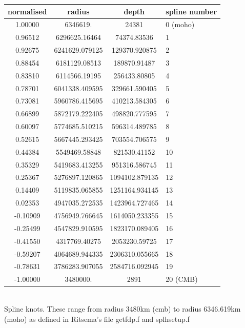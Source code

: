 \begin{center}
\begin{tabular}{cccl}
\hline 
normalised & radius & depth & spline number\\
\hline 
\hline 
1.00000  & 6346619.       &  24381          &0 (moho)\\
0.96512  & 6296625.16464  &  74374.83536    &1\\
0.92675  & 6241629.079125 &  129370.920875  &2\\
0.88454  & 6181129.08513  &  189870.91487   &3\\
0.83810  & 6114566.19195  &  256433.80805   &4\\
0.78701  & 6041338.409595 &  329661.590405  &5\\
0.73081  & 5960786.415695 &  410213.584305  &6\\
0.66899  & 5872179.222405 &  498820.777595  &7\\
0.60097  & 5774685.510215 &  596314.489785  &8\\
0.52615  & 5667445.293425 &  703554.706575  &9\\
0.44384  & 5549469.58848  &  821530.41152   &10\\
0.35329  & 5419683.413255 &  951316.586745  &11\\
0.25367  & 5276897.120865 &  1094102.879135 &12\\
0.14409  & 5119835.065855 &  1251164.934145 &13\\
0.02353  & 4947035.272535 &  1423964.727465 &14\\
-0.10909 & 4756949.766645 &  1614050.233355 &15\\
-0.25499 & 4547829.910595 &  1823170.089405 &16\\
-0.41550 & 4317769.40275  &  2053230.59725  &17\\
-0.59207 & 4064689.944335 &  2306310.055665 &18\\
-0.78631 & 3786283.907055 &  2584716.092945 &19\\
-1.00000 & 3480000.       &  2891           &20  (CMB) \\
\hline
\end{tabular}\\
{\captionfont Spline knots. These range from radius 3480km (cmb) to radius 6346.619km (moho) 
as defined in Ritsema's file getfdp.f and splhsetup.f}
\end{center}

